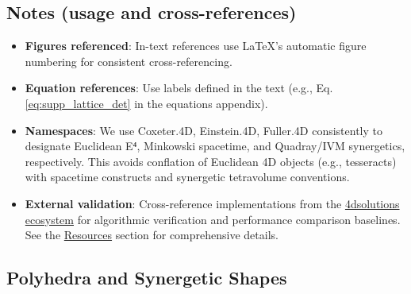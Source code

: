 \documentclass[
  10pt,
]{article}
\providecommand{\tightlist}{%
  \setlength{\itemsep}{0pt}\setlength{\parskip}{0pt}}
\begin{document}
\hypertarget{notes-usage-and-cross-references}{%
\subsection{Notes (usage and
cross-references)}\label{notes-usage-and-cross-references}}

\begin{itemize}
\tightlist
\item
  \textbf{Figures referenced}: In-text references use LaTeX's automatic
  figure numbering for consistent cross-referencing.
\item
  \textbf{Equation references}: Use labels defined in the text (e.g.,
  Eq. \eqref{eq:supp_lattice_det} in the equations appendix).
\item
  \textbf{Namespaces}: We use Coxeter.4D, Einstein.4D, Fuller.4D
  consistently to designate Euclidean E⁴, Minkowski spacetime, and
  Quadray/IVM synergetics, respectively. This avoids conflation of
  Euclidean 4D objects (e.g., tesseracts) with spacetime constructs and
  synergetic tetravolume conventions.
\item
  \textbf{External validation}: Cross-reference implementations from the
  \href{https://github.com/4dsolutions}{4dsolutions ecosystem} for
  algorithmic verification and performance comparison baselines. See the
  \href{07_resources.md}{Resources} section for comprehensive details.
\end{itemize}

\hypertarget{polyhedra-and-synergetic-shapes}{%
\subsection{Polyhedra and Synergetic
Shapes}\label{polyhedra-and-synergetic-shapes}}
\end{document}
